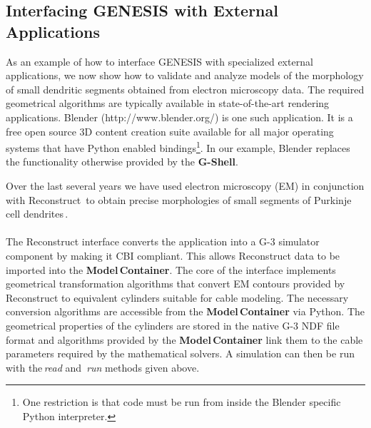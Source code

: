 \documentclass[10pt]{article}
\begin{document}
\subsection*{Interfacing GENESIS with External Applications}


As an example of how to interface GENESIS with specialized external
applications, we now show how to validate and analyze models of the
morphology of small dendritic segments obtained from electron
microscopy data.  The required geometrical algorithms are typically
available in state-of-the-art rendering applications.  Blender
(http://www.blender.org/) is one such application. It is a free open source 3D content creation
suite available for all major operating systems that have Python
enabled bindings\footnote{ One restriction is that code must be run
  from inside the Blender specific Python interpreter.}. In our
example, Blender replaces the functionality otherwise provided by the
{\bf G-Shell}.

Over the last several years we have used electron microscopy (EM) in conjunction
with Reconstruct\,\cite{jc05:_recon} to obtain precise
morphologies of small segments of Purkinje cell
dendrites\,\cite{huo09:_purkin, cornelis08:_model_neuros_genes}.\\

 \\

The Reconstruct interface converts the application
into a G-3 simulator component by making it CBI compliant. This allows
Reconstruct data to be imported into the {\bf Model\,Container}.
The core of the interface implements geometrical transformation
algorithms that convert EM contours provided by Reconstruct to
equivalent cylinders suitable for cable modeling. The necessary conversion algorithms are accessible from the
{\bf Model\,Container} via Python.
The geometrical properties of the cylinders are stored in the native
G-3 NDF file format and algorithms provided by the {\bf Model\,Container}
link them to the cable parameters required by the mathematical
solvers.  A simulation can then be run with the\,{\it read} and\,{\it
  run} methods given above.
\end{document}
